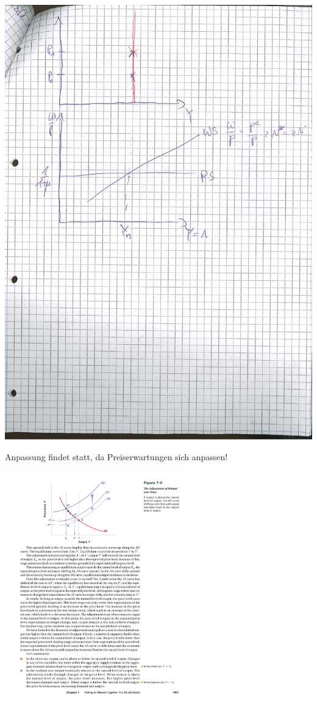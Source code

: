 \documentclass{scrartcl}
\begin{document}
\begin{enumerate}[a)]
\begin{center}
  \includegraphics[width=\textwidth]{Bilder/ASmittlereFrist.pdf}
\end{center}
Anpassung findet statt, da Preiserwartungen sich anpassen!
      \begin{center}
  \includegraphics[width=0.6\textwidth]{Bilder/ASmittlereFristAnpassung.pdf}
\end{center}
\end{enumerate}
\end{document}
